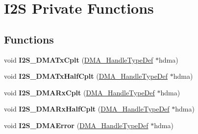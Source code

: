 \hypertarget{group___i2_s___private___functions}{}\section{I2S Private Functions}
\label{group___i2_s___private___functions}
\subsection*{Functions}
\begin{DoxyCompactItemize}
\item 
void {\bfseries I2\+S\+\_\+\+D\+M\+A\+Tx\+Cplt} (\hyperlink{group___d_m_a___exported___types_ga41b754a906b86bce54dc79938970138b}{D\+M\+A\+\_\+\+Handle\+Type\+Def} $\ast$hdma)\hypertarget{group___i2_s___private___functions_ga716b431b25e7fd7c359dcc0ed9ffb6e2}{}\label{group___i2_s___private___functions_ga716b431b25e7fd7c359dcc0ed9ffb6e2}

\item 
void {\bfseries I2\+S\+\_\+\+D\+M\+A\+Tx\+Half\+Cplt} (\hyperlink{group___d_m_a___exported___types_ga41b754a906b86bce54dc79938970138b}{D\+M\+A\+\_\+\+Handle\+Type\+Def} $\ast$hdma)\hypertarget{group___i2_s___private___functions_gaf2d811c698cf13db91942c5b7e0c4a85}{}\label{group___i2_s___private___functions_gaf2d811c698cf13db91942c5b7e0c4a85}

\item 
void {\bfseries I2\+S\+\_\+\+D\+M\+A\+Rx\+Cplt} (\hyperlink{group___d_m_a___exported___types_ga41b754a906b86bce54dc79938970138b}{D\+M\+A\+\_\+\+Handle\+Type\+Def} $\ast$hdma)\hypertarget{group___i2_s___private___functions_ga8d2bf0ca3ff0f11da49d3e8616c75d36}{}\label{group___i2_s___private___functions_ga8d2bf0ca3ff0f11da49d3e8616c75d36}

\item 
void {\bfseries I2\+S\+\_\+\+D\+M\+A\+Rx\+Half\+Cplt} (\hyperlink{group___d_m_a___exported___types_ga41b754a906b86bce54dc79938970138b}{D\+M\+A\+\_\+\+Handle\+Type\+Def} $\ast$hdma)\hypertarget{group___i2_s___private___functions_ga21556bd3ebfc035450de4628b5b029d8}{}\label{group___i2_s___private___functions_ga21556bd3ebfc035450de4628b5b029d8}

\item 
void {\bfseries I2\+S\+\_\+\+D\+M\+A\+Error} (\hyperlink{group___d_m_a___exported___types_ga41b754a906b86bce54dc79938970138b}{D\+M\+A\+\_\+\+Handle\+Type\+Def} $\ast$hdma)\hypertarget{group___i2_s___private___functions_gaba9556ceca0ad8bffa4946c2bb2598ae}{}\label{group___i2_s___private___functions_gaba9556ceca0ad8bffa4946c2bb2598ae}


\end{DoxyCompactItemize}
